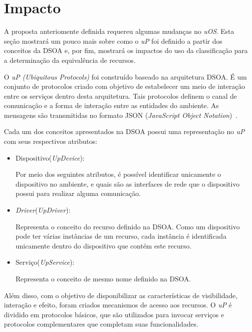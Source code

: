 \section{Impacto}
\label{sec:impactoUOS}

A proposta anteriomente definida requereu algumas mudanças no \emph{uOS}. Esta seção mostrará um pouco mais sobre como o \emph{uP} foi definido a partir dos conceitos da DSOA e, por fim, mostrará os impactos do uso da classificação para a determinação da equivalência de recursos.

O \emph{uP (Ubiquitous Protocols)} foi construído baseado na arquitetura DSOA. É um conjunto de protocolos criado com objetivo de estabelecer um meio de interação entre os serviços dentro desta arquitetura. Tais protocolos definem o canal de comunicação e a forma de interação entre as entidades do ambiente. As mensagens são transmitidas no formato JSON (\emph{JavaScript Object Notation})~\cite{json}.

Cada um dos conceitos apresentados na DSOA possui uma representação no \emph{uP} com seus respectivos atributos:

\begin{itemize}
	\item Dispositivo(\emph{UpDevice}):
	
		Por meio dos seguintes atributos, é possível identificar unicamente o dispositivo no ambiente, e quais são as interfaces de rede que o dispositivo possui para realizar alguma comunicação.

	\item \emph{Driver}(\emph{UpDriver}): 

		Representa o conceito do recurso definido na DSOA. Como um dispositivo pode ter várias instâncias de um recurso, cada instância é identificada unicamente dentro do dispositivo que contém este recurso.

	\item Serviço(\emph{UpService}): 

		Representa o conceito de mesmo nome definido na DSOA.
\end{itemize}

Além disso, com o objetivo de disponibilizar as características de visibilidade, interação e efeito, foram criados mecanismos de acesso aos recursos. O \emph{uP} é dividido em protocolos básicos, que são utilizados para invocar serviços e protocolos complementares que completam suas funcionalidades.

